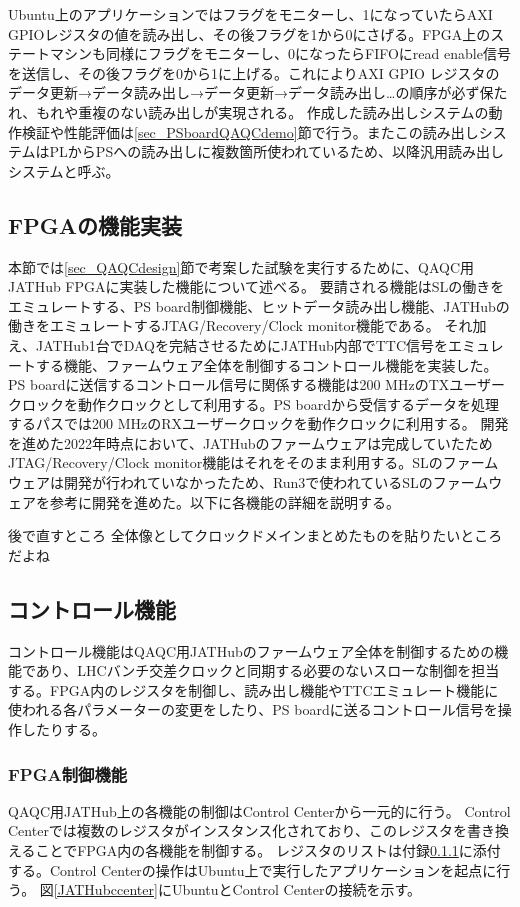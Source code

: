 Ubuntu上のアプリケーションではフラグをモニターし、1になっていたらAXI GPIOレジスタの値を読み出し、その後フラグを1から0にさげる。FPGA上のステートマシンも同様にフラグをモニターし、0になったらFIFOにread enable信号を送信し、その後フラグを0から1に上げる。これによりAXI GPIO レジスタのデータ更新→データ読み出し→データ更新→データ読み出し…の順序が必ず保たれ、もれや重複のない読み出しが実現される。
作成した読み出しシステムの動作検証や性能評価は\ref{sec_PSboardQAQCdemo}節で行う。またこの読み出しシステムはPLからPSへの読み出しに複数箇所使われているため、以降汎用読み出しシステムと呼ぶ。


\subsection{FPGAの機能実装}
\label{subsec_function}
本節では\ref{sec_QAQCdesign}節で考案した試験を実行するために、QAQC用JATHub FPGAに実装した機能について述べる。
要請される機能はSLの働きをエミュレートする、PS board制御機能、ヒットデータ読み出し機能、JATHubの働きをエミュレートするJTAG/Recovery/Clock monitor機能である。
それ加え、JATHub1台でDAQを完結させるためにJATHub内部でTTC信号をエミュレートする機能、ファームウェア全体を制御するコントロール機能を実装した。
PS boardに送信するコントロール信号に関係する機能は200 MHzのTXユーザークロックを動作クロックとして利用する。PS boardから受信するデータを処理するパスでは200 MHzのRXユーザークロックを動作クロックに利用する。
開発を進めた2022年時点において、JATHubのファームウェアは完成していたためJTAG/Recovery/Clock monitor機能はそれをそのまま利用する。SLのファームウェアは開発が行われていなかったため、Run3で使われているSLのファームウェアを参考に開発を進めた。以下に各機能の詳細を説明する。
\begin{itembox}{後で直すところ}
    全体像としてクロックドメインまとめたものを貼りたいところだよね
\end{itembox}

\subsection*{\textbf{コントロール機能}}
\label{subsubsec_control}
コントロール機能はQAQC用JATHubのファームウェア全体を制御するための機能であり、LHCバンチ交差クロックと同期する必要のないスローな制御を担当する。FPGA内のレジスタを制御し、読み出し機能やTTCエミュレート機能に使われる各パラメーターの変更をしたり、PS boardに送るコントロール信号を操作したりする。

\subsubsection{FPGA制御機能}
QAQC用JATHub上の各機能の制御はControl Centerから一元的に行う。
Control Centerでは複数のレジスタがインスタンス化されており、このレジスタを書き換えることでFPGA内の各機能を制御する。
レジスタのリストは付録\ref{}に添付する。Control Centerの操作はUbuntu上で実行したアプリケーションを起点に行う。
図\ref{JATHubccenter}にUbuntuとControl Centerの接続を示す。

